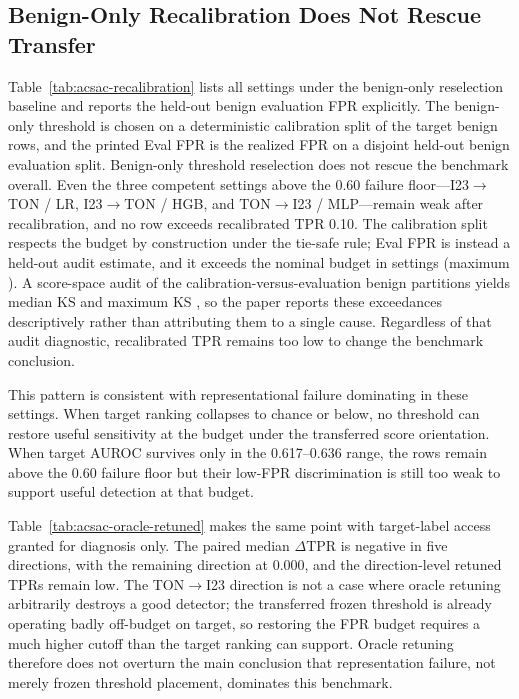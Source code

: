 \documentclass[10pt,conference]{IEEEtran}
\begin{document}
\FloatBarrier

\subsection{Benign-Only Recalibration Does Not Rescue Transfer}
\label{sec:recalibration-results}



Table~\ref{tab:acsac-recalibration} lists all \NaturalSettingCount{} settings under the benign-only reselection baseline and reports the held-out benign evaluation FPR explicitly. The benign-only threshold is chosen on a deterministic calibration split of the target benign rows, and the printed Eval FPR is the realized FPR on a disjoint held-out benign evaluation split. Benign-only threshold reselection does not rescue the benchmark overall. Even the three competent settings above the 0.60 failure floor---I23$\to$TON / LR, I23$\to$TON / HGB, and TON$\to$I23 / MLP---remain weak after recalibration, and no row exceeds recalibrated TPR 0.10. The calibration split respects the budget by construction under the tie-safe rule; Eval FPR is instead a held-out audit estimate, and it exceeds the nominal budget in \RecalibrationEvalFprExceedanceCount{} settings (maximum \RecalibrationEvalFprMax{}). A score-space audit of the calibration-versus-evaluation benign partitions yields median KS \RecalibrationPartitionScoreKsMedian{} and maximum KS \RecalibrationPartitionScoreKsMax{}, so the paper reports these exceedances descriptively rather than attributing them to a single cause. Regardless of that audit diagnostic, recalibrated TPR remains too low to change the benchmark conclusion.

This pattern is consistent with representational failure dominating in these settings. When target ranking collapses to chance or below, no threshold can restore useful sensitivity at the \FrozenFprTarget{} budget under the transferred score orientation. When target AUROC survives only in the 0.617--0.636 range, the rows remain above the 0.60 failure floor but their low-FPR discrimination is still too weak to support useful detection at that budget.



Table~\ref{tab:acsac-oracle-retuned} makes the same point with target-label access granted for diagnosis only. The paired median $\Delta$TPR is negative in five directions, with the remaining direction at 0.000, and the direction-level retuned TPRs remain low. The TON$\to$I23 direction is not a case where oracle retuning arbitrarily destroys a good detector; the transferred frozen threshold is already operating badly off-budget on target, so restoring the \FrozenFprTarget{} FPR budget requires a much higher cutoff than the target ranking can support. Oracle retuning therefore does not overturn the main conclusion that representation failure, not merely frozen threshold placement, dominates this benchmark.
\end{document}

